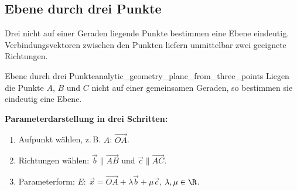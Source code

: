 \subsection{Ebene durch drei Punkte}
\label{subsec:analytic_geometry_plane_through_three_points}

Drei nicht auf einer Geraden liegende Punkte bestimmen eine Ebene eindeutig.
Verbindungsvektoren zwischen den Punkten liefern unmittelbar zwei geeignete
Richtungen.

\begin{KeyPointBox}{Ebene durch drei Punkte}{analytic_geometry_plane_from_three_points}
  Liegen die Punkte $A$, $B$ und $C$ nicht auf einer gemeinsamen Geraden, so
  bestimmen sie eindeutig eine Ebene.

  \begin{minipage}[t]{0.51\linewidth}
    \vspace{0pt}
    \textbf{Parameterdarstellung in drei Schritten:}
    \begin{enumerate}[leftmargin=1.6em,itemsep=0.25em]
      \item Aufpunkt wählen, z.\,B. $A$: $\overrightarrow{OA}$.
      \item Richtungen wählen:
        $\vec b\parallel\overrightarrow{AB}$ und
        $\vec c\parallel\overrightarrow{AC}$.
      \item Parameterform:
        $E:\ \vec x=\overrightarrow{OA}+\lambda\vec b+\mu\vec c$,
        $\lambda,\mu\in\R$.
    \end{enumerate}
  \end{minipage}\hfill
  \begin{minipage}[t]{0.46\linewidth}
    \vspace{0pt}\centering
  \end{minipage}

\end{KeyPointBox}

